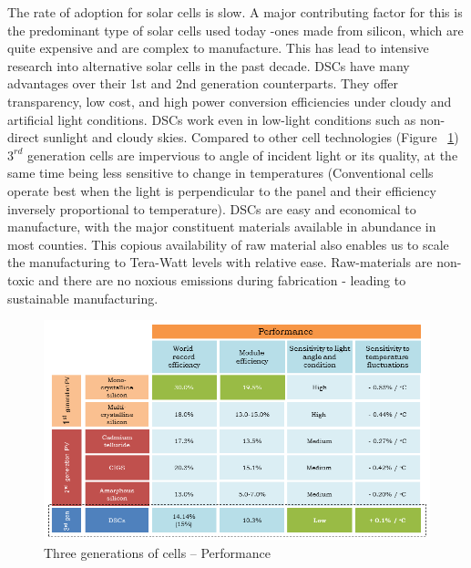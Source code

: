   The rate of adoption for solar cells is slow. A major contributing factor for this is the predominant type of solar cells used today -ones made from silicon, which are quite expensive and are complex to manufacture. This has lead to intensive research into alternative solar cells in the past decade. \ac{DSCs} have many advantages over their 1st and 2nd generation counterparts. They offer transparency, low cost, and high power conversion efficiencies under cloudy and artificial light conditions. \ac{DSCs} work even in low-light conditions such as non-direct sunlight and cloudy skies. Compared to other cell technologies (Figure ~\ref{fig:3rd_gen}) $3^{rd}$ generation cells are impervious to angle of incident light or its quality, at the same time being less sensitive to change in temperatures (Conventional cells operate best when the light is perpendicular to the panel and their efficiency inversely proportional to temperature). \ac{DSCs} are easy and economical to manufacture, with the major constituent materials available in abundance in most counties. This copious availability of raw material also enables us to scale the manufacturing to Tera-Watt levels with relative ease. Raw-materials are non-toxic and there are no noxious emissions during fabrication - leading to sustainable manufacturing.\\
  
   
  \begin{figure}[H]
  \begin{center}
  \includegraphics[width=\textwidth]{images/3rd_gen}
  \caption{ Three generations of cells –  Performance}
  \label{fig:3rd_gen}
  \end{center}
  \end{figure}
 
 
